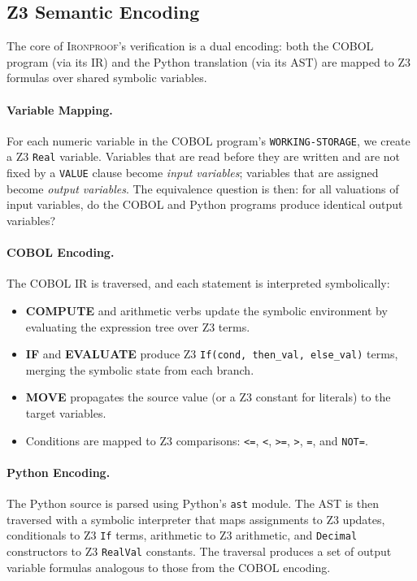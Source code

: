 \documentclass[sigconf,nonacm]{acmart}
\begin{document}
\subsection{Z3 Semantic Encoding}\label{sec:z3encoding}

The core of \textsc{Ironproof}'s verification is a dual encoding: both the COBOL program (via its IR) and the Python translation (via its AST) are mapped to Z3 formulas over shared symbolic variables.

\paragraph{Variable Mapping.} For each numeric variable in the COBOL program's \texttt{WORKING-STORAGE}, we create a Z3 \texttt{Real} variable. Variables that are read before they are written and are not fixed by a \texttt{VALUE} clause become \emph{input variables}; variables that are assigned become \emph{output variables}. The equivalence question is then: for all valuations of input variables, do the COBOL and Python programs produce identical output variables?

\paragraph{COBOL Encoding.} The COBOL IR is traversed, and each statement is interpreted symbolically:
\begin{itemize}
  \item \textbf{COMPUTE} and arithmetic verbs update the symbolic environment by evaluating the expression tree over Z3 terms.
  \item \textbf{IF} and \textbf{EVALUATE} produce Z3 \texttt{If(cond, then\_val, else\_val)} terms, merging the symbolic state from each branch.
  \item \textbf{MOVE} propagates the source value (or a Z3 constant for literals) to the target variables.
  \item Conditions are mapped to Z3 comparisons: \texttt{<=}, \texttt{<}, \texttt{>=}, \texttt{>}, \texttt{=}, and \texttt{NOT=}.
\end{itemize}

\paragraph{Python Encoding.} The Python source is parsed using Python's \texttt{ast} module. The AST is then traversed with a symbolic interpreter that maps assignments to Z3 updates, conditionals to Z3 \texttt{If} terms, arithmetic to Z3 arithmetic, and \texttt{Decimal} constructors to Z3 \texttt{RealVal} constants. The traversal produces a set of output variable formulas analogous to those from the COBOL encoding.
\end{document}
